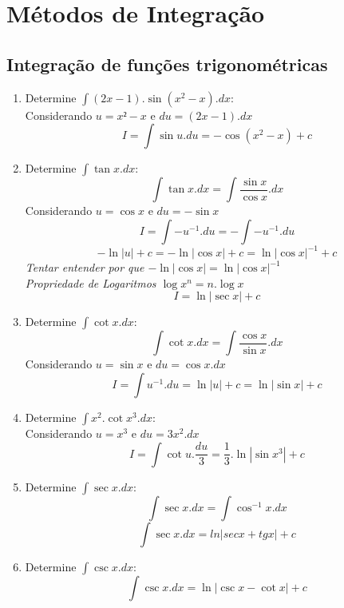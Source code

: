 \documentclass{article}
\begin{document}
	\section{Métodos de Integração}
		\subsection{Integração de funções trigonométricas}
			\begin{enumerate}
				\item Determine $\int (2x-1).\sin(x^2-x).dx$:\\
					Considerando $u = x²-x$ e $du = (2x-1).dx$
					$$I = \int \sin u . du=-\cos (x^2-x)+c$$
				\item Determine $\int \tan x.dx$:\\
					$$\int \tan x .dx = \int \dfrac{\sin x}{\cos x}.dx$$
					Considerando $u=\cos x$ e $du = -\sin x$
					$$I = \int -u^{-1}.du=-\int -u^{-1}.du $$
					$$-\ln |u|+c=-\ln |\cos x| +c=\ln |\cos x|^{-1}+c$$
					\textit{Tentar entender por que $-\ln |\cos x| = \ln |\cos x|^{-1}$}\\
					\textit{Propriedade de Logaritmos $\log x^n = n.\log x$}
					$$I = \ln |\sec x|+c$$
				\item Determine $\int \cot x.dx$:
					$$\int \cot x.dx = \int \dfrac{\cos x}{\sin x}.dx$$
					Considerando $u = \sin x$ e $du = \cos x.dx$
					$$I = \int u^{-1}.du=\ln |u|+c = \ln |\sin x| + c$$
				\item Determine $\int x^2.\cot x^3.dx$:\\
					Considerando $u = x^3$ e $du = 3x^2.dx$
					$$I = \int \cot u . \dfrac{du}{3}=\dfrac{1}{3}.\ln |\sin x^3| + c$$
				\item Determine $\int \sec x.dx$:\\
					$$\int \sec x.dx = \int \cos^{-1} x.dx$$
					$$ \int \sec x.dx = ln |sec x+tg x|+c$$
					
				\item Determine $\int \csc x.dx$:\\
					$$\int \csc x .dx = \ln|\csc x - \cot x|+c$$
				

\end{enumerate}
\end{document}
